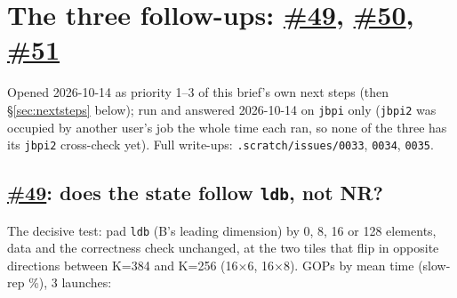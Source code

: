 \documentclass[10pt,a4paper]{article}
\newcommand{\iss}[1]{\href{https://github.com/JieGH/RVV_code_gen_via_MLIR_xDSL/issues/#1}{\##1}}
\begin{document}
\section{The three follow-ups: \iss{49}, \iss{50}, \iss{51}}
Opened 2026-10-14 as priority 1--3 of this brief's own next steps (then \S\ref{sec:nextsteps} below);
run and answered 2026-10-14 on \texttt{jbpi} only (\texttt{jbpi2} was occupied by another user's job the whole time each
ran, so none of the three has its \texttt{jbpi2} cross-check yet). Full write-ups: \texttt{.scratch/issues/0033}, \texttt{0034},
\texttt{0035}.

\subsection*{\iss{49}: does the state follow \texttt{ldb}, not NR?}
The decisive test: pad \texttt{ldb} (B's leading dimension) by 0, 8, 16 or 128 elements, data and the correctness check
unchanged, at the two tiles that flip in opposite directions between K=384 and K=256 (16$\times$6, 16$\times$8). GOPs by
mean time (slow-rep \%), 3 launches:
\end{document}
